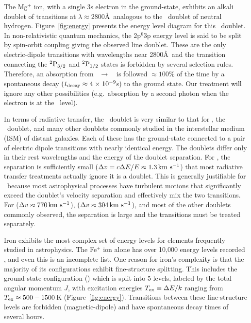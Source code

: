 \documentclass[12pt,preprint]{aastex}
\begin{document}
The Mg$^+$ ion, with a single 3s electron in the ground-state,
exhibits an alkali doublet of transitions at $\lambda \approx
2800$\AA\ analogous to the
\lya\ doublet of neutral hydrogen.  Figure~\ref{fig:energy}
presents the energy level diagram for this 
\mgiid\ doublet.  In non-relativistic quantum
mechanics, the 2p$^6$3p energy level is said to be split by spin-orbit
coupling giving the observed line doublet.  These are the only
 electric-dipole transitions 
with wavelengths near 2800\AA\ and the transition connecting
the $\rm {}^2P_{3/2}$ and $\rm {}^2P_{1/2}$ states is forbidden by several
selection rules.  Therefore, an absorption from
\maconfig~$\to$~\mbconfig\
is followed $\approx 100\%$ of the time by a spontaneous decay
($t_{\rm decay} \approx 4{\; \times \; 10^{-9}}$s) to the
ground state. Our treatment will ignore any other possibilities
(e.g.\ absorption by a second photon when the electron is at the \mbconfig\ level).

In terms of radiative transfer, the 
\mgiid\ doublet is very similar to that for 
\lya, the \naid\ doublet, and many other doublets commonly
studied in the interstellar medium (ISM) of distant galaxies.  
Each of these has the ground-state connected to a pair of electric
dipole transitions with nearly identical energy.
The doublets differ only in 
their rest wavelengths and the energy of the doublet separation. 
For \ion{H}{1} \lya, the
separation is sufficiently small ($\Delta v = c \Delta E / E \approx
1.3 \, {\rm km~s^{-1}}$) that most radiative transfer treatments actually ignore it
is a doublet.
This is generally justifiable for \lya\ because 
most astrophysical processes have turbulent motions that
significantly exceed the doublet's velocity separation and effectively mix the
two transitions.  For \ion{Mg}{2} ($\Delta v \approx 770 \, {\rm km~s^{-1}}$),  
\ion{Na}{1} ($\Delta v \approx 304 \, {\rm km~s^{-1}}$), and most of the other doublets
commonly observed, the separation is large and the transitions
must be treated separately.  

Iron exhibits the most complex set of energy levels for elements
frequently studied in astrophysics.  The Fe$^+$ ion alone has over
10,000 energy levels recorded \citep{iron}, and even this is an
incomplete list.  
One reason for iron's complexity is
that the majority of its configurations exhibit fine-structure splitting.
This includes the ground-state configuration (\aconfig) which is split
into 5 levels, 
labeled by the total angular momentum $J$, 
with excitation energies $T_{\rm ex} \equiv \Delta E / k$ ranging from
$T_{\rm ex} \approx 500-1500$\,K (Figure~\ref{fig:energy}).  
Transitions between these fine-structure levels are 
forbidden (magnetic-dipole) and have spontaneous decay times of several hours.  
\end{document}

